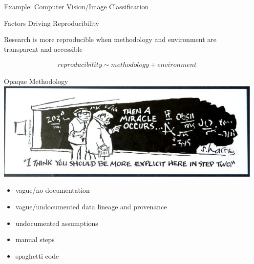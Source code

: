 \documentclass{beamer}
\begin{document}
\begin{frame}{Example: Computer Vision/Image Classification}



\end{frame}


\begin{frame}{Factors Driving Reproducibility}

\centering
Research is more reproducible when methodology and environment 
are \alert{transparent} and \alert{accessible}

\begin{align}
reproducibility \sim methodology + environment
\end{align}

\end{frame}



\begin{frame}{Opaque Methodology}
\includegraphics[width=\linewidth]{images/thenamiracleoccurs}

\begin{itemize}
\item vague/no documentation
\item vague/undocumented data lineage and provenance
\item undocumented assumptions
\item manual steps
\item spaghetti code
\end{itemize}
\end{frame}



%
\end{document}
